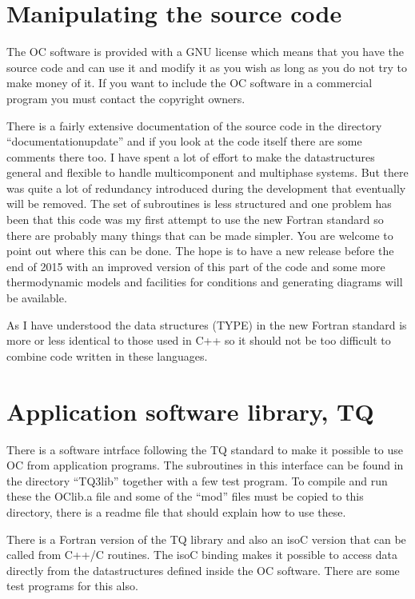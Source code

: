 \documentclass[12pt]{article}
\begin{document}
\section{Manipulating the source code}

The OC software is provided with a GNU license which means that you
have the source code and can use it and modify it as you wish as long
as you do not try to make money of it.  If you want to include the OC
software in a commercial program you must contact the copyright
owners.

There is a fairly extensive documentation of the source code in the
directory ``documentationupdate'' and if you look at the code itself
there are some comments there too.  I have spent a lot of effort to
make the datastructures general and flexible to handle multicomponent
and multiphase systems.  But there was quite a lot of redundancy
introduced during the development that eventually will be removed.
The set of subroutines is less structured and one problem has been
that this code was my first attempt to use the new Fortran standard so
there are probably many things that can be made simpler.  You are
welcome to point out where this can be done.  The hope is to have a
new release before the end of 2015 with an improved version of this
part of the code and some more thermodynamic models and facilities for
conditions and generating diagrams will be available.

As I have understood the data structures (TYPE) in the new Fortran
standard is more or less identical to those used in C++ so it should
not be too difficult to combine code written in these languages.

\section{Application software library, TQ}

There is a software intrface following the TQ standard to make it
possible to use OC from application programs.  The subroutines in this
interface can be found in the directory ``TQ3lib'' together with a few
test program.  To compile and run these the OClib.a file and some of
the ``mod'' files must be copied to this directory, there is a readme
file that should explain how to use these.

There is a Fortran version of the TQ library and also an isoC version
that can be called from C++/C routines.  The isoC binding makes it
possible to access data directly from the datastructures defined
inside the OC software.  There are some test programs for this also.
\end{document}

